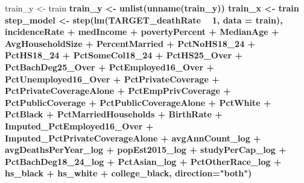 \documentclass[
  11pt,
]{article}
\newenvironment{Shaded}{\begin{snugshade}}{\end{snugshade}}
\newcommand{\DataTypeTok}[1]{\textcolor[rgb]{0.13,0.29,0.53}{#1}}
\newcommand{\DecValTok}[1]{\textcolor[rgb]{0.00,0.00,0.81}{#1}}
\newcommand{\KeywordTok}[1]{\textcolor[rgb]{0.13,0.29,0.53}{\textbf{#1}}}
\newcommand{\NormalTok}[1]{#1}
\newcommand{\OperatorTok}[1]{\textcolor[rgb]{0.81,0.36,0.00}{\textbf{#1}}}
\newcommand{\StringTok}[1]{\textcolor[rgb]{0.31,0.60,0.02}{#1}}
\begin{document}
\begin{Shaded}
\begin{Highlighting}[]
{{{{{{{{{{{{{{{{{{{{{{{{{{{{{{{{{{{{{{{{{{{{{{{{{{{{{{{{{{{{{{{{{{\NormalTok{train_y <-}\StringTok{ }\NormalTok{train }\OperatorTok{%
\NormalTok{train_y <-}\StringTok{ }\KeywordTok{unlist}\NormalTok{(}\KeywordTok{unname}\NormalTok{(train_y))}
\NormalTok{train_x <-}\StringTok{ }\NormalTok{train }\OperatorTok{%
\NormalTok{step_model <-}\StringTok{ }\KeywordTok{step}\NormalTok{(}\KeywordTok{lm}\NormalTok{(TARGET_deathRate }\OperatorTok{~}\StringTok{ }\DecValTok{1}\NormalTok{, }\DataTypeTok{data =}\NormalTok{ train), }\OperatorTok{~}\StringTok{ }\NormalTok{incidenceRate }\OperatorTok{+}\StringTok{ }\NormalTok{medIncome }\OperatorTok{+}\StringTok{ }\NormalTok{povertyPercent }\OperatorTok{+}\StringTok{ }\NormalTok{MedianAge }\OperatorTok{+}\StringTok{ }\NormalTok{AvgHouseholdSize }\OperatorTok{+}\StringTok{ }\NormalTok{PercentMarried }\OperatorTok{+}\StringTok{ }\NormalTok{PctNoHS18_}\DecValTok{24} \OperatorTok{+}\StringTok{ }\NormalTok{PctHS18_}\DecValTok{24} \OperatorTok{+}\StringTok{ }\NormalTok{PctSomeCol18_}\DecValTok{24} \OperatorTok{+}\StringTok{ }\NormalTok{PctHS25_Over }\OperatorTok{+}\StringTok{ }\NormalTok{PctBachDeg25_Over }\OperatorTok{+}\StringTok{ }\NormalTok{PctEmployed16_Over }\OperatorTok{+}\StringTok{ }\NormalTok{PctUnemployed16_Over }\OperatorTok{+}\StringTok{ }\NormalTok{PctPrivateCoverage }\OperatorTok{+}\StringTok{ }\NormalTok{PctPrivateCoverageAlone }\OperatorTok{+}\StringTok{ }\NormalTok{PctEmpPrivCoverage }\OperatorTok{+}\StringTok{ }\NormalTok{PctPublicCoverage }\OperatorTok{+}\StringTok{ }\NormalTok{PctPublicCoverageAlone }\OperatorTok{+}\StringTok{ }\NormalTok{PctWhite }\OperatorTok{+}\StringTok{ }\NormalTok{PctBlack }\OperatorTok{+}\StringTok{ }\NormalTok{PctMarriedHouseholds }\OperatorTok{+}\StringTok{ }\NormalTok{BirthRate }\OperatorTok{+}\StringTok{ }\NormalTok{Imputed_PctEmployed16_Over }\OperatorTok{+}\StringTok{ }\NormalTok{Imputed_PctPrivateCoverageAlone }\OperatorTok{+}\StringTok{ }\NormalTok{avgAnnCount_log }\OperatorTok{+}\StringTok{ }\NormalTok{avgDeathsPerYear_log }\OperatorTok{+}\StringTok{ }\NormalTok{popEst2015_log }\OperatorTok{+}\StringTok{ }\NormalTok{studyPerCap_log }\OperatorTok{+}\StringTok{ }\NormalTok{PctBachDeg18_}\DecValTok{24}\NormalTok{_log }\OperatorTok{+}\StringTok{ }\NormalTok{PctAsian_log }\OperatorTok{+}\StringTok{ }\NormalTok{PctOtherRace_log }\OperatorTok{+}\StringTok{ }\NormalTok{hs_black }\OperatorTok{+}\StringTok{ }\NormalTok{hs_white }\OperatorTok{+}\StringTok{ }\NormalTok{college_black, }\DataTypeTok{direction=}\StringTok{"both"}\NormalTok{)}
}}}}}}}}}}}}}}}}}}}}}}}}}}}}}}}}}}}}}}}}}}}}}}}}}}}}}}}}}}}}}}}}}}}}
\end{Highlighting}
\end{Shaded}
\end{document}
